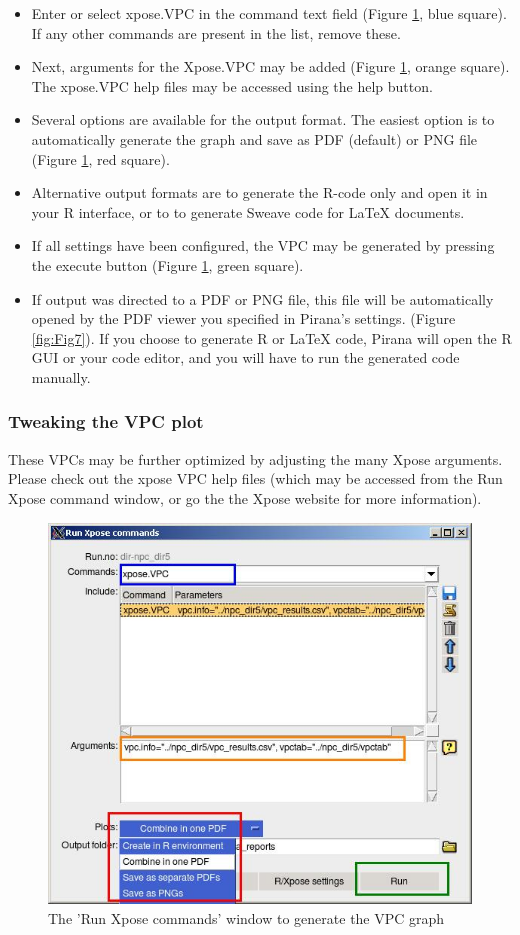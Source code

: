 \begin{itemize}
\item Enter or select xpose.VPC in the command text field (Figure \ref{fig:Fig6},
  blue square). If any other commands are present in the list, remove these.
\item Next, arguments for the Xpose.VPC may be added (Figure \ref{fig:Fig6}, orange
  square).  The xpose.VPC help files may be accessed using the help
  button.
\item Several options are available for the output format. The easiest
  option is to automatically generate the graph and save as PDF
  (default) or PNG file (Figure \ref{fig:Fig6}, red square).
\item Alternative output formats are to generate the R-code only and
  open it in your R interface, or to to generate Sweave code for LaTeX
  documents.
\item If all settings have been configured, the VPC may be generated
  by pressing the execute button (Figure \ref{fig:Fig6}, green square).
\item If output was directed to a PDF or PNG file, this file will be 
  automatically opened by the PDF viewer you specified in Pirana's
  settings. (Figure \ref{fig:Fig7}). If you choose to generate R or LaTeX code,
  Pirana will open the R GUI or your code editor, and you will have to
  run the generated code manually.
\end{itemize}

\subsubsection*{Tweaking the VPC plot}
These VPCs may be further optimized by adjusting the many Xpose
arguments. Please check out the xpose VPC help files (which may be
accessed from the Run Xpose command window, or go the the Xpose
website for more information).

\begin{figure}[h] \centering
    \includegraphics[scale=.4]{images/vpc_6.jpg}
    \caption{The 'Run Xpose commands' window to generate the VPC graph
      \label{fig:Fig6}}
\end{figure}

